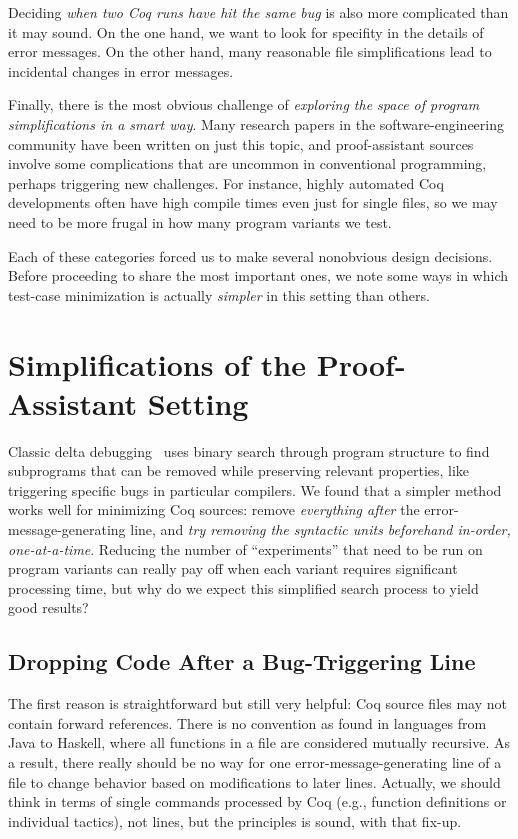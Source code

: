 \documentclass[a4paper,USenglish,cleveref,autoref,thm-restate]{lipics-v2021}
\begin{document}
Deciding \emph{when two Coq runs have hit the same bug} is also more complicated than it may sound.
On the one hand, we want to look for specifity in the details of error messages.
On the other hand, many reasonable file simplifications lead to incidental changes in error messages.

Finally, there is the most obvious challenge of \emph{exploring the space of program simplifications in a smart way}.
Many research papers in the software-engineering community have been written on just this topic, and proof-assistant sources involve some complications that are uncommon in conventional programming, perhaps triggering new challenges.
For instance, highly automated Coq developments often have high compile times even just for single files, so we may need to be more frugal in how many program variants we test.

Each of these categories forced us to make several nonobvious design decisions.
Before proceeding to share the most important ones, we note some ways in which test-case minimization is actually \emph{simpler} in this setting than others.


\section{Simplifications of the Proof-Assistant Setting}\label{sec:easier}

Classic delta debugging~\cite{Zeller2002} uses binary search through program structure to find subprograms that can be removed while preserving relevant properties, like triggering specific bugs in particular compilers.
We found that a simpler method works well for minimizing Coq sources: remove \emph{everything after} the error-message-generating line, and \emph{try removing the syntactic units beforehand in-order, one-at-a-time}.
Reducing the number of ``experiments'' that need to be run on program variants can really pay off when each variant requires significant processing time, but why do we expect this simplified search process to yield good results?

\subsection{Dropping Code After a Bug-Triggering Line}

The first reason is straightforward but still very helpful: Coq source files may not contain forward references.
There is no convention as found in languages from Java to Haskell, where all functions in a file are considered mutually recursive.
As a result, there really should be no way for one error-message-generating line of a file to change behavior based on modifications to later lines.
Actually, we should think in terms of single commands processed by Coq (e.g., function definitions or individual tactics), not lines, but the principles is sound, with that fix-up.
\end{document}
